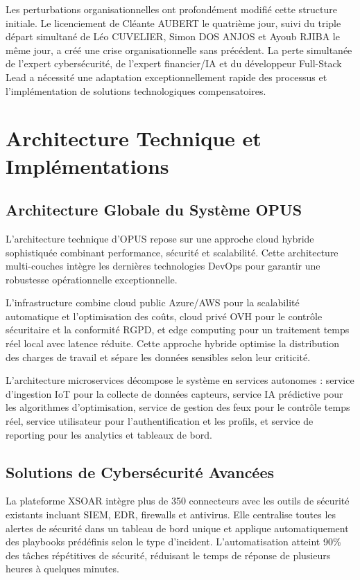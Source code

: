 \documentclass[12pt,a4paper]{article}
\begin{document}
Les perturbations organisationnelles ont profondément modifié cette structure initiale. Le licenciement de Cléante AUBERT le quatrième jour, suivi du triple départ simultané de Léo CUVELIER, Simon DOS ANJOS et Ayoub RJIBA le même jour, a créé une crise organisationnelle sans précédent. La perte simultanée de l'expert cybersécurité, de l'expert financier/IA et du développeur Full-Stack Lead a nécessité une adaptation exceptionnellement rapide des processus et l'implémentation de solutions technologiques compensatoires.

\section{Architecture Technique et Implémentations}

\subsection{Architecture Globale du Système OPUS}

L'architecture technique d'OPUS repose sur une approche cloud hybride sophistiquée combinant performance, sécurité et scalabilité. Cette architecture multi-couches intègre les dernières technologies DevOps pour garantir une robustesse opérationnelle exceptionnelle.

L'infrastructure combine cloud public Azure/AWS pour la scalabilité automatique et l'optimisation des coûts, cloud privé OVH pour le contrôle sécuritaire et la conformité RGPD, et edge computing pour un traitement temps réel local avec latence réduite. Cette approche hybride optimise la distribution des charges de travail et sépare les données sensibles selon leur criticité.

L'architecture microservices décompose le système en services autonomes : service d'ingestion IoT pour la collecte de données capteurs, service IA prédictive pour les algorithmes d'optimisation, service de gestion des feux pour le contrôle temps réel, service utilisateur pour l'authentification et les profils, et service de reporting pour les analytics et tableaux de bord.

\subsection{Solutions de Cybersécurité Avancées}


La plateforme XSOAR intègre plus de 350 connecteurs avec les outils de sécurité existants incluant SIEM, EDR, firewalls et antivirus. Elle centralise toutes les alertes de sécurité dans un tableau de bord unique et applique automatiquement des playbooks prédéfinis selon le type d'incident. L'automatisation atteint 90\% des tâches répétitives de sécurité, réduisant le temps de réponse de plusieurs heures à quelques minutes.
\end{document}
